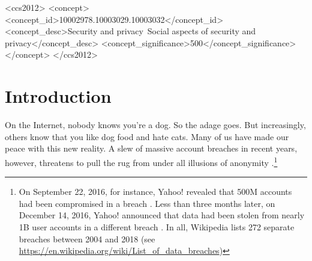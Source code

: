 \documentclass[sigconf]{acmart}
\begin{document}
%
%
\begin{CCSXML}
<ccs2012>
<concept>
<concept_id>10002978.10003029.10003032</concept_id>
<concept_desc>Security and privacy~Social aspects of security and privacy</concept_desc>
<concept_significance>500</concept_significance>
</concept>
</ccs2012>
\end{CCSXML}



%

%

%
\maketitle

\section{Introduction}
On the Internet, nobody knows you're a dog. So the adage goes. But increasingly, others know that you like dog food and hate cats. Many of us have made our peace with this new reality. A slew of massive account breaches in recent years, however, threatens to pull the rug from under all illusions of anonymity \cite{mccandless}.\footnote{On September 22, 2016, for instance, Yahoo! revealed that 500M accounts had been compromised in a breach \cite{fiegerman}. Less than three months later, on December 14, 2016, Yahoo! announced that data had been stolen from nearly 1B user accounts in a different breach \cite{newman}. In all, Wikipedia lists 272 separate breaches between 2004 and 2018 (see \href{https://en.wikipedia.org/wiki/List_of_data_breaches}{https://en.wikipedia.org/wiki/List\_of\_data\_breaches})}
\end{document}
